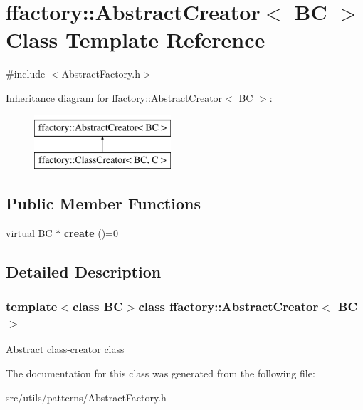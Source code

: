 \hypertarget{classffactory_1_1_abstract_creator}{\section{ffactory\-:\-:Abstract\-Creator$<$ B\-C $>$ Class Template Reference}
\label{classffactory_1_1_abstract_creator}
}


{\ttfamily \#include $<$Abstract\-Factory.\-h$>$}

Inheritance diagram for ffactory\-:\-:Abstract\-Creator$<$ B\-C $>$\-:\begin{figure}[H]
\begin{center}
\leavevmode
\includegraphics[height=2.000000cm]{classffactory_1_1_abstract_creator}
\end{center}
\end{figure}
\subsection*{Public Member Functions}
\begin{DoxyCompactItemize}
\item 
\hypertarget{classffactory_1_1_abstract_creator_ac9caa13d5fd6ed198700d3d9a6f2b92e}{virtual B\-C $\ast$ {\bfseries create} ()=0}\label{classffactory_1_1_abstract_creator_ac9caa13d5fd6ed198700d3d9a6f2b92e}

\end{DoxyCompactItemize}


\subsection{Detailed Description}
\subsubsection*{template$<$class B\-C$>$class ffactory\-::\-Abstract\-Creator$<$ B\-C $>$}

Abstract class-\/creator class 

The documentation for this class was generated from the following file\-:\begin{DoxyCompactItemize}
\item 
src/utils/patterns/Abstract\-Factory.\-h\end{DoxyCompactItemize}
